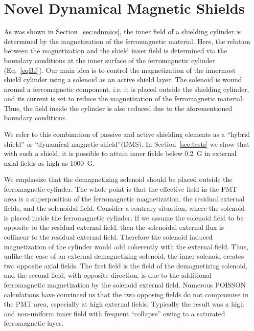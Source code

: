 \documentclass[12pt]{article}
\begin{document}
\section{Novel Dynamical Magnetic Shields}
\label{sec:novelle}

As was shown in Section~\ref{sec:ednmics}, the inner field of a shielding 
cylinder is determined by the magnetization of the ferromagnetic material.
Here, the relation between the magnetization and the shield inner field is 
determined via the boundary conditions at the inner surface of the ferromagnetic 
cylinder (Eq.~\ref{eqBJ}). Our main idea is to control the magnetization of the 
innermost shield cylinder using a solenoid as an active shield layer. The 
solenoid is wound around a ferromagnetic component, i.e. it is placed outside the 
shielding cylinder, and its current is set to reduce the magnetization of the 
ferromagnetic material. Thus, the field inside the cylinder is also reduced due to
the aforementioned boundary conditions. 

We refer to this combination of passive and active shielding elements as 
a ``hybrid shield'' or ``dynamical magnetic  shield''(DMS). In Section~\ref{sec:tests} 
we show that with such a shield, it is possible to attain inner fields below 
0.2~G in external axial fields as high as 1000~G.

We emphasize that the demagnetizing  solenoid should be placed outside the 
ferromagnetic cylinder. The whole point is that the effective field in the PMT 
area is a superposition of the ferromagnetic magnetization, the residual external 
fields, and the solenoidal field. Consider a contrary situation, where the 
solenoid is placed inside the ferromagnetic cylinder. If we assume the solenoid 
field to be opposite to the residual external field, then the solenoidal external 
flux is collinear to the residual external field. Therefore the solenoid induced 
magnetization of the cylinder would add coherently with the external field. Thus, 
unlike the case of an external demagnetizing solenoid, the inner solenoid creates 
two opposite axial fields. The first field is the field of the demagnetizing 
solenoid, and the second field, with opposite direction, is due to the additional 
ferromagnetic magnetization by the solenoid external field. Numerous POISSON 
calculations have convinced us that the two opposing fields do not compromise in 
the PMT area, especially at high external fields. Typically the result was a high 
and non-uniform inner field with frequent ``collapse'' owing to a saturated 
ferromagnetic layer. 
\end{document}
